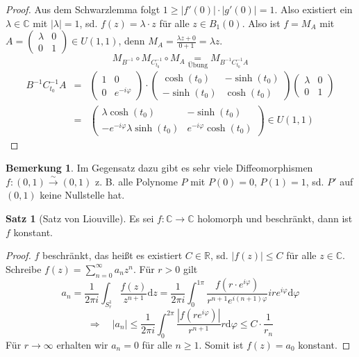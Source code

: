\documentclass[11pt,titlepage]{article}
\theoremstyle{definition}
\newtheorem{theorem}{Satz}[section]
\newtheorem{remark}{Bemerkung}
\theoremstyle{remark}
\begin{document}
\begin{proof}
		Aus dem Schwarzlemma folgt $1\geq |f'(0)|\cdot |g'(0)|=1$. Also existiert ein $\lambda\in 
		\mathbb{C}$ mit $|\lambda|=1$, sd. $f(z)=\lambda \cdot z$ für alle $z\in B_1(0)$. 
		Also ist $f=M_A$ mit $A=\left( \begin{smallmatrix}\lambda&0\\0&1\end{smallmatrix}\right) 
		\in U(1,1)$, denn $M_A =\frac{\lambda z+0}{0+1}=\lambda z$.
		\[M_{B^{-1}}\circ M_{C_{t_0}^{-1}}\circ M_A \underset{\text{Übung}}{=} M_{B^{-1}C_{t_0}^{-1}A}\]
		\begin{eqnarray*}
			B^{-1}C_{t_0}^{-1} A &=& \begin{pmatrix}1&0\\0&e^{-i\varphi}\end{pmatrix}\cdot 
			\begin{pmatrix}\cosh(t_0)&-\sinh(t_0)\\-\sinh(t_0)&\cosh(t_0)\end{pmatrix}
			\begin{pmatrix}\lambda&0\\0&1\end{pmatrix}\\
			&=&\begin{pmatrix} \lambda \cosh(t_0)&-\sinh(t_0)\\-e^{-i\varphi}\lambda\sinh(t_0) &
			e^{-i\varphi}\cosh(t_0)\end{pmatrix}\in U(1,1)
		\end{eqnarray*}
	\end{proof}
	
	\begin{remark}
		Im Gegensatz dazu gibt es sehr viele Diffeomorphismen $f:(0,1)\overset{\sim}{\to}(0,1)$ 
		z. B. alle Polynome $P$ mit $P(0)=0$, $P(1)=1$, sd. $P'$ auf $(0,1)$ keine Nullstelle hat.
	\end{remark}
	
	\begin{theorem}[Satz von Liouville] \label{thm:LV}
		Es sei $f:\mathbb{C}\to\mathbb{C}$ holomorph und beschränkt, dann ist $f$ konstant.
	\end{theorem}
	
	\begin{proof}
		$f$ beschränkt, das heißt es existiert $C\in\mathbb{R}$, sd. $|f(z)|\leq C$ für alle 
		$z\in\mathbb{C}$. Schreibe $f(z)=\sum_{n=0}^{\infty} a_n z^n$. Für $r>0$ gilt
		\[a_n=\frac{1}{2\pi i}\int_{S_r^1}\frac{f(z)}{z^{n+1}}\mathrm{d}z =
		\frac{1}{2\pi i}\int_0^{1\pi}\frac{f(r\cdot e^{i\varphi})}{r^{n+1}e^{i(n+1)\varphi}}ire^{i\varphi}
		\mathrm{d}\varphi \]
		\[ \Rightarrow\quad |a_n|\leq \frac{1}{2\pi i}\int_0^{2\pi}\frac{|f(re^{i\varphi})|}{r^{n+1}}r 
		\mathrm{d}\varphi\leq C\cdot \frac{1}{r_n} \]
		Für $r\to\infty$ erhalten wir $a_n =0$ für alle $n\geq 1$. Somit ist $f(z)=a_0$ konstant.
	\end{proof}
	
\end{document}
